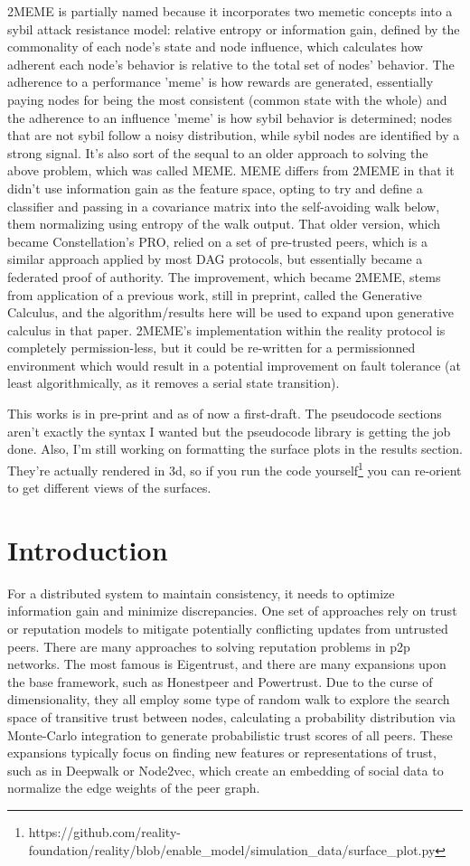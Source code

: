 \documentclass{article}
\begin{document}
2MEME is partially named because it incorporates two memetic concepts into a sybil attack resistance model: relative entropy or information gain, defined by the commonality of each node's state and node influence, which calculates how adherent each node's behavior is relative to the total set of nodes' behavior. The adherence to a performance 'meme' is how rewards are generated, essentially paying nodes for being the most consistent (common state with the whole) and the adherence to an influence 'meme' is how sybil behavior is determined; nodes that are not sybil follow a noisy distribution, while sybil nodes are identified by a strong signal. It's also sort of the sequal to an older approach to solving the above problem, which was called MEME. MEME differs from 2MEME in that it didn't use information gain as the feature space, opting to try and define a classifier and passing in a covariance matrix into the self-avoiding walk below, them normalizing using entropy of the walk output. That older version, which became Constellation's PRO, relied on a set of pre-trusted peers, which is a similar approach applied by most DAG protocols, but essentially became a federated proof of authority. The improvement, which became 2MEME, stems from application of a previous work, still in preprint, called the Generative Calculus, and the algorithm/results here will be used to expand upon generative calculus in that paper. 2MEME's implementation within the reality protocol is completely permission-less, but it could be re-written for a permissionned environment which would result in a potential improvement on fault tolerance (at least algorithmically, as it removes a serial state transition).

This works is in pre-print and as of now a first-draft. The pseudocode sections aren't exactly the syntax I wanted but the pseudocode library is getting the job done. Also, I'm still working on formatting the surface plots in the results section. They're actually rendered in 3d, so if you run the code yourself\footnote{https://github.com/reality-foundation/reality/blob/enable\_model/simulation\_data/surface\_plot.py} you can re-orient to get different views of the surfaces.

\section{Introduction}
For a distributed system to maintain consistency, it needs to optimize information gain and minimize discrepancies. One set of approaches rely on trust or reputation models to mitigate potentially conflicting updates from untrusted peers. There are many approaches to solving reputation problems in p2p networks. The most famous is Eigentrust, and there are many expansions upon the base framework, such as Honestpeer and Powertrust. Due to the curse of dimensionality, they all employ some type of random walk to explore the search space of transitive trust between nodes, calculating a probability distribution via Monte-Carlo integration to generate probabilistic trust scores of all peers. These expansions typically focus on finding new features or representations of trust, such as in Deepwalk or Node2vec, which create an embedding of social data to normalize the edge weights of the peer graph.
\end{document}
